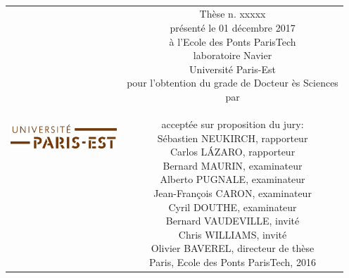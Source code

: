 \begin{titlepage}
\begin{center}


\null\vspace{2cm}
{
{\ttfamily\huge \mytitle} \\[24pt] 
}    
\vfill

\begin{tabular} {cc}
\parbox{0.3\textwidth}{\includegraphics[width=4cm]{head/logo_upe}}
&
\parbox{0.7\textwidth}{%
	Thèse n. xxxxx\\
	présenté le 01 décembre 2017\\
	à l'Ecole des Ponts ParisTech\\
	laboratoire Navier\\
%
	Université Paris-Est\\[6pt]
	pour l'obtention du grade de Docteur ès Sciences\\
	par\\ [4pt]
	\null \hspace{3em} \myauthor\\[9pt]
%
\small
acceptée sur proposition du jury:\\[4pt]
%
    Sébastien NEUKIRCH, rapporteur\\
    Carlos LÁZARO, rapporteur\\
    Bernard MAURIN, examinateur\\
    Alberto PUGNALE, examinateur\\
    Jean-François CARON, examinateur\\
    Cyril DOUTHE, examinateur\\
    Bernard VAUDEVILLE, invité\\
    Chris WILLIAMS, invité\\
    Olivier BAVEREL, directeur de thèse\\[12pt]
%
Paris, Ecole des Ponts ParisTech, 2016}
\end{tabular}
\end{center}
\vspace{2cm}
\end{titlepage}



